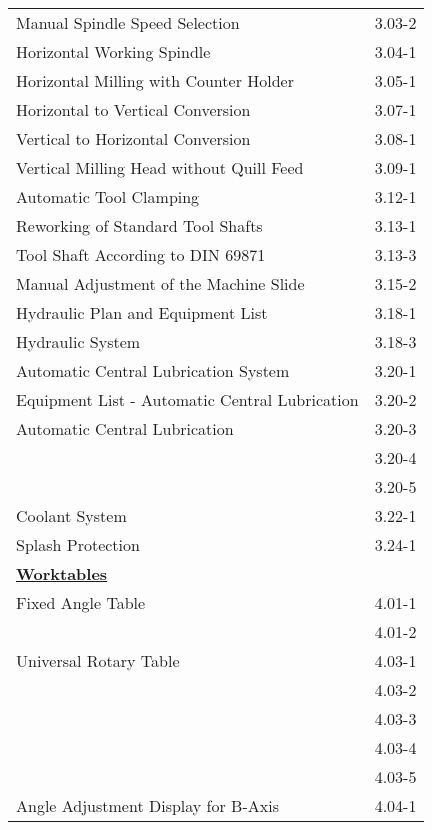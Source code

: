 \newpage

\begin{tabularx}{\textwidth}{X r}
    Manual Spindle Speed Selection \dotfill & 3.03-2 \\
    Horizontal Working Spindle \dotfill & 3.04-1 \\
    Horizontal Milling with Counter Holder \dotfill & 3.05-1 \\
    Horizontal to Vertical Conversion \dotfill & 3.07-1 \\
    Vertical to Horizontal Conversion \dotfill & 3.08-1 \\
    Vertical Milling Head without Quill Feed \dotfill & 3.09-1 \\
    Automatic Tool Clamping \dotfill & 3.12-1 \\
    Reworking of Standard Tool Shafts \dotfill & 3.13-1 \\
    Tool Shaft According to DIN 69871 \dotfill & 3.13-3 \\
    Manual Adjustment of the Machine Slide \dotfill & 3.15-2 \\
    Hydraulic Plan and Equipment List \dotfill & 3.18-1 \\
    Hydraulic System \dotfill & 3.18-3 \\
    Automatic Central Lubrication System \dotfill & 3.20-1 \\
    Equipment List - Automatic Central Lubrication \dotfill & 3.20-2 \\
    Automatic Central Lubrication \dotfill & 3.20-3 \\
     & 3.20-4 \\
     & 3.20-5 \\
    Coolant System \dotfill & 3.22-1 \\
    Splash Protection \dotfill & 3.24-1 \\[0.5cm]

    \textbf{\underline{Worktables}} & \\
    Fixed Angle Table \dotfill & 4.01-1 \\
     & 4.01-2 \\
    Universal Rotary Table \dotfill & 4.03-1 \\
     & 4.03-2 \\
     & 4.03-3 \\
     & 4.03-4 \\
     & 4.03-5 \\
     Angle Adjustment Display for B-Axis \dotfill & 4.04-1 \\[0.5cm]
\end{tabularx}


